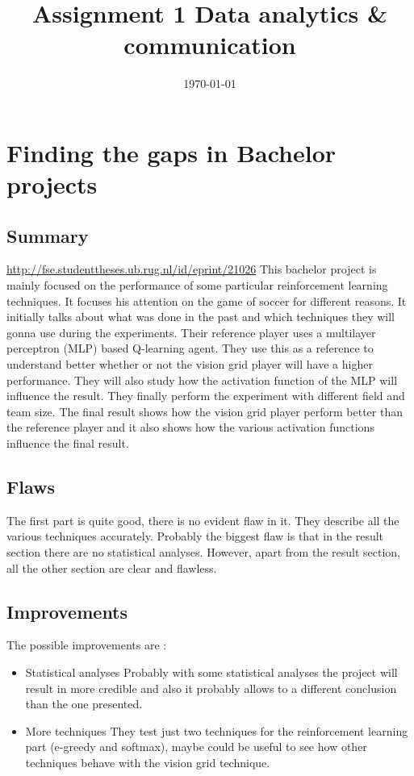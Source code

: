 \documentclass[11pt]{article}
\date{\today}
\title{Assignment 1 Data analytics \& communication}
\begin{document}
\maketitle
\tableofcontents


\section{Finding the gaps in Bachelor projects}
\label{sec:orgd273957}
\subsection{Summary}
\label{sec:org06f6b2b}
\url{http://fse.studenttheses.ub.rug.nl/id/eprint/21026}
This bachelor project is mainly focused on the performance of some particular reinforcement learning techniques.
It focuses his attention on the game of soccer for different reasons. It initially talks about what was done in the past
and which techniques they will gonna use during the experiments.
Their reference player uses a multilayer perceptron  (MLP) based Q-learning agent. They use this as a reference to understand better whether or not the vision grid player will have a higher performance. They will also study how
the activation function of the MLP will influence the result.
They finally perform the experiment with different field and team size. The final result shows how the vision grid
player perform better than the reference player and it also shows how the various activation functions influence the final
result.

\subsection{Flaws}
\label{sec:org684458f}
The first part is quite good, there is no evident flaw in it. They describe all the various techniques accurately.
Probably the biggest flaw is that in the result section there are no statistical analyses.
However, apart from the result section, all the other section are clear and flawless.
\subsection{Improvements}
\label{sec:org045ecaf}
The possible improvements are :
\begin{itemize}
\item Statistical analyses
  Probably with some statistical analyses the project will result in more credible and also it probably allows to a different conclusion than the one presented.
\item More techniques
  They test just two techniques for the reinforcement learning part (e-greedy and softmax),
  maybe could be useful to see how other techniques behave with the vision grid technique.
\end{itemize}
\end{document}
